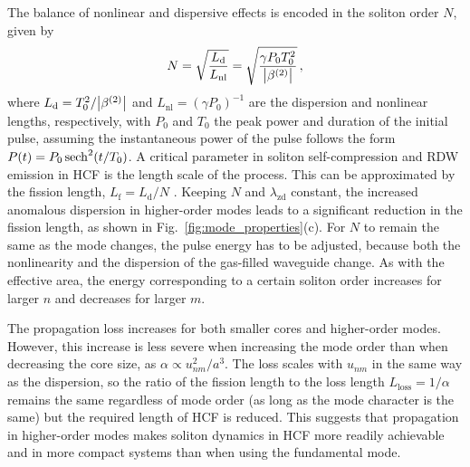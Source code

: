 \documentclass[amsmath, preprint, floatfix]{revtex4-2}
\begin{document}
The balance of nonlinear and dispersive effects is encoded in the soliton order $N$, given by
\begin{equation}
    N = \sqrt{\frac{L_\mathrm{d}}{L_\mathrm{nl}}} = \sqrt{\frac{\gamma P_0 T_0^2}{\abs{\beta^{(2)}}}}\,,
\end{equation}
where $L_\mathrm{d} = T_0^2/\abs{\beta^{(2)}}$ and $L_\mathrm{nl} = (\gamma P_0)^{-1}$ are the dispersion and nonlinear lengths, respectively, with $P_0$ and $T_0$ the peak power and duration of the initial pulse, assuming the instantaneous power of the pulse follows the form $P(t) = P_0 \sech^2(t/T_0)$. A critical parameter in soliton self-compression and RDW emission in HCF is the length scale of the process. This can be approximated by the fission length, $L_\mathrm{f} = L_\mathrm{d}/N$ \cite{dudley_supercontinuum_2006}. Keeping $N$ and $\lambda_\mathrm{zd}$ constant, the increased anomalous dispersion in higher-order modes leads to a significant reduction in the fission length, as shown in Fig.~\ref{fig:mode_properties}(c). For $N$ to remain the same as the mode changes, the pulse energy has to be adjusted, because both the nonlinearity and the dispersion of the gas-filled waveguide change. As with the effective area, the energy corresponding to a certain soliton order increases for larger $n$ and decreases for larger $m$.

The propagation loss increases for both smaller cores and higher-order modes. However, this increase is less severe when increasing the mode order than when decreasing the core size, as $\alpha \propto u_{nm}^2/a^3$. The loss scales with $u_{nm}$ in the same way as the dispersion, so the ratio of the fission length to the loss length $L_\mathrm{loss} = 1/\alpha$ remains the same regardless of mode order (as long as the mode character is the same) but the required length of HCF is reduced. This suggests that propagation in higher-order modes makes soliton dynamics in HCF more readily achievable and in more compact systems than when using the fundamental mode.
\end{document}
